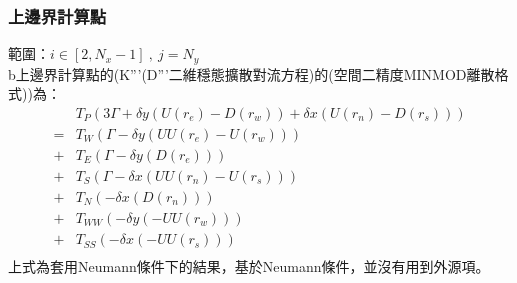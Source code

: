 \documentclass[12pt]{article}
\begin{document}
\subsubsection{上邊界計算點}
\noindent 範圍：$i \in [2,N_{x}-1]\ ,\ j = N_{y}$\\[1.5ex]
\noindent b上邊界計算點的(K'''(D'''二維穩態擴散對流方程)的(空間二精度MINMOD離散格式))為：
\begin{equation}\begin{split}
    &T_{P}(3\Gamma + \delta y (U(r_{e})-D(r_{w})) + \delta x (U(r_{n})-D(r_{s}))) \\[1.5ex]
    =&T_{W}(\Gamma - \delta y (UU(r_{e}) - U(r_{w})))\\[1.5ex]
    +&T_{E}(\Gamma - \delta y (D(r_{e})))\\[1.5ex]
    +&T_{S}(\Gamma - \delta x (UU(r_{n})-U(r_{s})))\\[1.5ex]
    +&T_{N}(- \delta x (D(r_{n})))\\[1.5ex]
    +&T_{WW}(-\delta y (-UU(r_{w})))\\[1.5ex]
    +&T_{SS}(- \delta x (-UU(r_{s})))\\[1.5ex]
\end{split}\end{equation}
上式為套用Neumann條件下的結果，基於Neumann條件，並沒有用到外源項。
\end{document}
